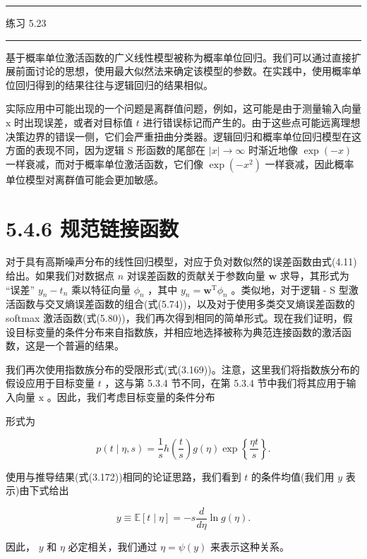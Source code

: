 \documentclass[10pt]{report}
\newcommand{\HRule}{\begin{center}\rule{0.9\linewidth}{0.2mm}\end{center}}
\begin{document}
\HRule

练习 5.23

\HRule

基于概率单位激活函数的广义线性模型被称为概率单位回归。我们可以通过直接扩展前面讨论的思想，使用最大似然法来确定该模型的参数。在实践中，使用概率单位回归得到的结果往往与逻辑回归的结果相似。

实际应用中可能出现的一个问题是离群值问题，例如，这可能是由于测量输入向量 \(\mathrm{x}\) 时出现误差，或者对目标值 \(t\) 进行错误标记而产生的。由于这些点可能远离理想决策边界的错误一侧，它们会严重扭曲分类器。逻辑回归和概率单位回归模型在这方面的表现不同，因为逻辑 S 形函数的尾部在 \(\left| x\right|  \rightarrow  \infty\) 时渐近地像 \(\exp \left( {-x}\right)\) 一样衰减，而对于概率单位激活函数，它们像 \(\exp \left( {-{x}^{2}}\right)\) 一样衰减，因此概率单位模型对离群值可能会更加敏感。

\section*{5.4.6 规范链接函数}

对于具有高斯噪声分布的线性回归模型，对应于负对数似然的误差函数由式(4.11)给出。如果我们对数据点 \(n\) 对误差函数的贡献关于参数向量 \(\mathbf{w}\) 求导，其形式为 “误差” \({y}_{n} - {t}_{n}\) 乘以特征向量 \({\phi }_{n}\) ，其中 \({y}_{n} = {\mathbf{w}}^{\mathrm{T}}{\phi }_{n}\) 。类似地，对于逻辑 - S 型激活函数与交叉熵误差函数的组合(式(5.74))，以及对于使用多类交叉熵误差函数的 softmax 激活函数(式(5.80))，我们再次得到相同的简单形式。现在我们证明，假设目标变量的条件分布来自指数族，并相应地选择被称为典范连接函数的激活函数，这是一个普遍的结果。

我们再次使用指数族分布的受限形式(式(3.169))。注意，这里我们将指数族分布的假设应用于目标变量 \(t\) ，这与第 5.3.4 节不同，在第 5.3.4 节中我们将其应用于输入向量 \(\mathrm{x}\) 。因此，我们考虑目标变量的条件分布

形式为

\[
p\left( {t \mid  \eta ,s}\right)  = \frac{1}{s}h\left( \frac{t}{s}\right) g\left( \eta \right) \exp \left\{  \frac{\eta t}{s}\right\}  . \tag{5.89}
\]

使用与推导结果(式(3.172))相同的论证思路，我们看到 \(t\) 的条件均值(我们用 \(y\) 表示)由下式给出

\[
y \equiv  \mathbb{E}\left\lbrack  {t \mid  \eta }\right\rbrack   =  - s\frac{d}{d\eta }\ln g\left( \eta \right) . \tag{5.90}
\]

因此， \(y\) 和 \(\eta\) 必定相关，我们通过 \(\eta  = \psi \left( y\right)\) 来表示这种关系。
\end{document}
